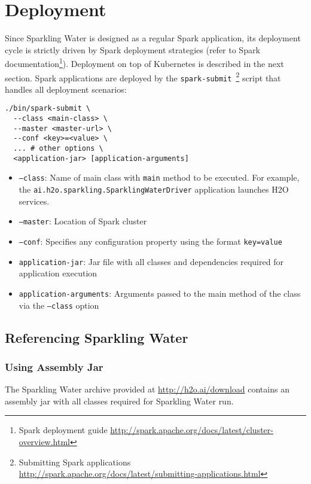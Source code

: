 \section{Deployment}
Since Sparkling Water is designed as a regular Spark application, its deployment cycle is strictly driven by Spark
deployment strategies (refer to Spark documentation\footnote{Spark deployment guide \url{http://spark.apache.org/docs/latest/cluster-overview.html}}).
Deployment on top of Kubernetes is described in the next section.
Spark applications are deployed by the \texttt{spark-submit}~\footnote{Submitting Spark applications \url{http://spark.apache.org/docs/latest/submitting-applications.html}}
script that handles all deployment scenarios:

\begin{lstlisting}[style=Bash]
./bin/spark-submit \
  --class <main-class> \
  --master <master-url> \
  --conf <key>=<value> \
  ... # other options \
  <application-jar> [application-arguments]
\end{lstlisting}

\begin{itemize}
	\item \texttt{--class}: Name of main class with \texttt{main} method to be executed. For example, the \texttt{ai.h2o.sparkling.SparklingWaterDriver} application launches H2O services.
	\item \texttt{--master}: Location of Spark cluster
	\item \texttt{--conf}: Specifies any configuration property using the format \texttt{key=value}
	\item \texttt{application-jar}: Jar file with all classes and dependencies required for application execution
	\item \texttt{application-arguments}: Arguments passed to the main method of the class via the \texttt{--class} option
\end{itemize}

\subsection{Referencing Sparkling Water}

\subsubsection{Using Assembly Jar}
The Sparkling Water archive provided at \url{http://h2o.ai/download} contains an assembly jar with all classes required for Sparkling Water run.

